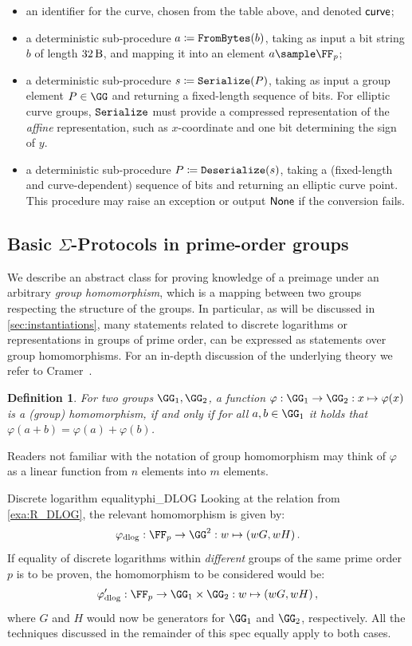 \documentclass[11pt]{article}
\newtheorem{definition}{Definition}
\begin{document}
\begin{itemize}
  \item an identifier for the curve, chosen from the table above, and denoted $\textsf{curve}$;
  \item a deterministic sub-procedure $a \coloneqq \texttt{FromBytes}(b)$, taking as input a bit string $b$ of length $\seedlen$, and mapping it into an element $a \sample \FF_p$;
  \item a deterministic sub-procedure $s \coloneqq \texttt{Serialize}(P)$, taking as input a group element $P \in \GG$ and returning a fixed-length sequence of bits.
  For elliptic curve groups, $\texttt{Serialize}$ must provide a compressed representation of the \emph{affine} representation, such as $x$-coordinate and one bit determining the sign of $y$.
  \item a deterministic sub-procedure $P \coloneqq \texttt{Deserialize}(s)$, taking a (fixed-length and curve-dependent) sequence of bits and returning an elliptic curve point. This procedure may raise an exception or output $\mathsf{None}$ if the conversion fails.
\end{itemize}

\subsection{Basic $\Sigma$-Protocols in prime-order groups}\label{sec:basic_sigma}
  We describe an abstract class for proving knowledge of a preimage under an arbitrary \emph{group homomorphism}, which is a mapping between two groups respecting the structure of the groups.
In particular, as will be discussed in \cref{sec:instantiations}, many statements related to discrete logarithms or representations in groups of prime order, can be expressed as statements over group homomorphisms.
For an in-depth discussion of the underlying theory we refer to Cramer~\cite{cramer97}.

\begin{definition}
  For two groups $\GG_1,\GG_2$, a function $\varphi:\GG_1\to\GG_2:x\mapsto\varphi(x)$ is a \emph{(group) homomorphism}, if and only if for all $a,b\in\GG_1$ it holds that $\varphi(a+b)=\varphi(a)+\varphi(b)$.
\end{definition}
Readers not familiar with the notation of group homomorphism may think of $\varphi$ as a linear function from $n$ elements into $m$ elements.

\begin{example}{Discrete logarithm equality}{phi_DLOG}
  Looking at the relation from \cref{exa:R_DLOG}, the relevant homomorphism is given by:
	$$
	  \varphi_{\operatorname{dlog}} : \FF_p\to\GG^2 : \witness\mapsto (\witness G,\witness H)\,.
	$$
	If equality of discrete logarithms within \emph{different} groups of the same prime order $p$ is to be proven, the homomorphism to be considered would be:
	$$
	  \varphi_{\operatorname{dlog}}' : \FF_p\to\GG_1\times\GG_2 : \witness\mapsto (\witness G,\witness H)\,,
	$$
	where $G$ and $H$ would now be generators for $\GG_1$ and $\GG_2$, respectively.
	All the techniques discussed in the remainder of this spec equally apply to both cases.
\end{example}
\end{document}
